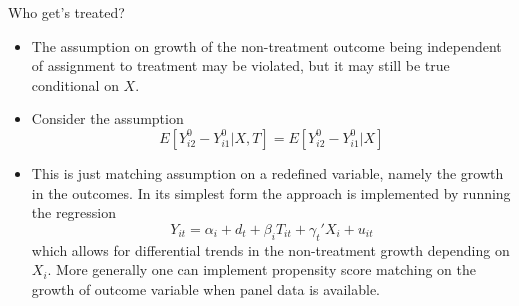   
\begin{frame}{Who get's treated?}
\begin{itemize}
\item The assumption on growth of the non-treatment outcome being independent of assignment to treatment may be violated, but it may still be true conditional on $X$.
\item Consider the assumption
$$ E[Y_{i2}^0- Y_{i1}^0 | X,T] = E[Y_{i2}^0- Y_{i1}^0 | X] $$ 
\item This is just matching assumption on a redefined variable, namely the growth in the outcomes. In its simplest form the approach is implemented by running the regression
$$ Y_{it} = \alpha_i + d_t + \beta_i T_{it} + \gamma_t' X_i + u_{it}$$ 
which allows for differential trends in the non-treatment growth depending on $X_i$. More generally one can implement propensity score matching on the growth of outcome variable when panel data is available.
\end{itemize}
\end{frame}

